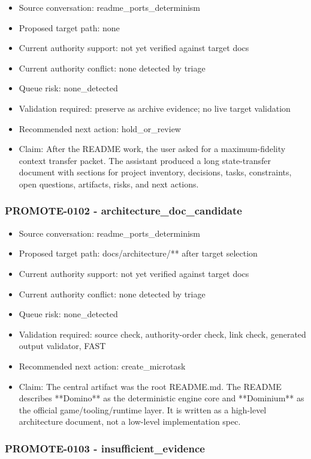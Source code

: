 \documentclass[11pt,a4paper]{report}
\begin{document}
\begin{itemize}
\item Source conversation: readme\_ports\_determinism
\item Proposed target path: none
\item Current authority support: not yet verified against target docs
\item Current authority conflict: none detected by triage
\item Queue risk: none\_detected
\item Validation required: preserve as archive evidence; no live target validation
\item Recommended next action: hold\_or\_review
\item Claim: After the README work, the user asked for a maximum-fidelity context transfer packet. The assistant produced a long state-transfer document with sections for project inventory, decisions, tasks, constraints, open questions, artifacts, risks, and next actions.
\end{itemize}

\subsubsection{PROMOTE-0102 - architecture\_doc\_candidate}

\begin{itemize}
\item Source conversation: readme\_ports\_determinism
\item Proposed target path: docs/architecture/** after target selection
\item Current authority support: not yet verified against target docs
\item Current authority conflict: none detected by triage
\item Queue risk: none\_detected
\item Validation required: source check, authority-order check, link check, generated output validator, FAST
\item Recommended next action: create\_microtask
\item Claim: The central artifact was the root README.md. The README describes **Domino** as the deterministic engine core and **Dominium** as the official game/tooling/runtime layer. It is written as a high-level architecture document, not a low-level implementation spec.
\end{itemize}

\subsubsection{PROMOTE-0103 - insufficient\_evidence}
\end{document}
